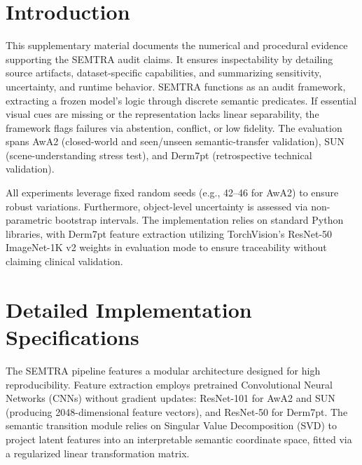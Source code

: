 \documentclass[make,supfile,submit,pdftex,moreauthors]{Definitions/mdpi}
\begin{document}
\section{Introduction}
\label{sec:intro}

This supplementary material documents the numerical and procedural evidence supporting the SEMTRA audit claims. It ensures inspectability by detailing source artifacts, dataset-specific capabilities, and summarizing sensitivity, uncertainty, and runtime behavior. SEMTRA functions as an audit framework, extracting a frozen model's logic through discrete semantic predicates. If essential visual cues are missing or the representation lacks linear separability, the framework flags failures via abstention, conflict, or low fidelity. The evaluation spans AwA2 (closed-world and seen/unseen semantic-transfer validation), SUN (scene-understanding stress test), and Derm7pt (retrospective technical validation).

All experiments leverage fixed random seeds (e.g., 42--46 for AwA2) to ensure robust variations. Furthermore, object-level uncertainty is assessed via non-parametric bootstrap intervals. The implementation relies on standard Python libraries, with Derm7pt feature extraction utilizing TorchVision's ResNet-50 ImageNet-1K v2 weights in evaluation mode to ensure traceability without claiming clinical validation.

\section{Detailed Implementation Specifications}
\label{sec:implementation_details}

The SEMTRA pipeline features a modular architecture designed for high reproducibility. Feature extraction employs pretrained Convolutional Neural Networks (CNNs) without gradient updates: ResNet-101 for AwA2 and SUN (producing 2048-dimensional feature vectors), and ResNet-50 for Derm7pt. The semantic transition module relies on Singular Value Decomposition (SVD) to project latent features into an interpretable semantic coordinate space, fitted via a regularized linear transformation matrix.
\end{document}
